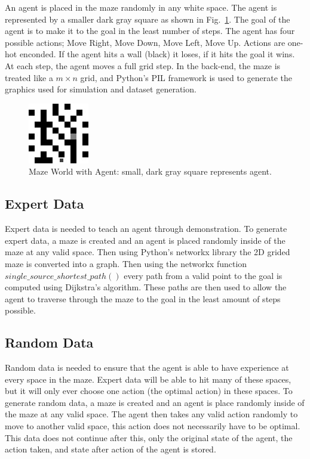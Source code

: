 \documentclass[12pt,american]{report}
\begin{document}
An agent is placed in the maze randomly in any white space.  The agent is represented by a smaller dark gray square as shown in Fig.~\ref{fig:maze_with_agent}. The goal of the agent is to make it to the goal in the least number of steps.  The agent has four possible actions; Move Right, Move Down, Move Left, Move Up. Actions are one-hot enconded. If the agent hits a wall (black) it loses, if it hits the goal it wins. At each step, the agent moves a full grid step.  In the back-end, the maze is treated like a $m\times n$ grid, and Python's PIL framework is used to generate the graphics used for simulation and dataset generation.
\begin{figure}
\centering
\includegraphics[scale=1.5]{images/maze_with_agent.jpg}
\caption{Maze World with Agent: small, dark gray square represents agent.}
\label{fig:maze_with_agent}
\end{figure}

\subsection{Expert Data}
Expert data is needed to teach an agent through demonstration.  To generate expert data, a maze is created and an agent is placed randomly inside of the maze at any valid space. Then using Python's networkx library the 2D grided maze is converted into a graph.  Then using the networkx function $single\_source\_shortest\_path()$ every path from a valid point to the goal is computed using Dijkstra's algorithm. These paths are then used to allow the agent to traverse through the maze to the goal in the least amount of steps possible.

\subsection{Random Data}
\label{sec:random_data}
Random data is needed to ensure that the agent is able to have experience at every space in the maze.  Expert data will be able to hit many of these spaces, but it will only ever choose one action (the optimal action) in these spaces. To generate random data, a maze is created and an agent is place randomly inside of the maze at any valid space.  The agent then takes any valid action randomly to move to another valid space, this action does not necessarily have to be optimal. This data does not continue after this, only the original state of the agent, the action taken, and state after action of the agent is stored.
\end{document}
